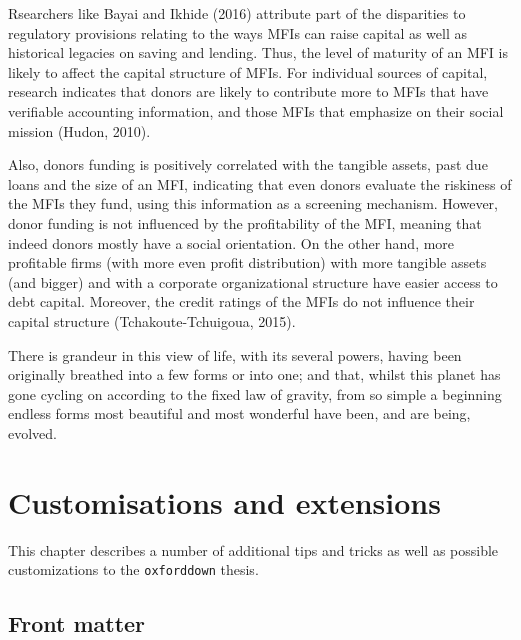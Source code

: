 \documentclass[a4paper, nobind]{templates/ociamthesis}
\begin{document}
Rsearchers like Bayai and Ikhide (2016) attribute part of the disparities to regulatory provisions relating to the ways MFIs can raise capital as well as historical legacies on saving and lending. Thus, the level of maturity of an MFI is likely to affect the capital structure of MFIs. For individual sources of capital, research indicates that donors are likely to contribute more to MFIs that have verifiable accounting information, and those MFIs that emphasize on their social mission (Hudon, 2010).

Also, donors funding is positively correlated with the tangible assets, past due loans and the size of an MFI, indicating that even donors evaluate the riskiness of the MFIs they fund, using this information as a screening mechanism. However, donor funding is not influenced by the profitability of the MFI, meaning that indeed donors mostly have a social orientation. On the other hand, more profitable firms (with more even profit distribution) with more tangible assets (and bigger) and with a corporate organizational structure have easier access to debt capital. Moreover, the credit ratings of the MFIs do not influence their capital structure (Tchakoute-Tchuigoua, 2015).

\begin{savequote}
There is grandeur in this view of life, with its several powers, having
been originally breathed into a few forms or into one; and that, whilst
this planet has gone cycling on according to the fixed law of gravity,
from so simple a beginning endless forms most beautiful and most
wonderful have been, and are being, evolved.
\end{savequote}



\hypertarget{customisations-and-extensions}{%
\chapter{Customisations and extensions}\label{customisations-and-extensions}}

\minitoc 

\noindent This chapter describes a number of additional tips and tricks as well as possible customizations to the \texttt{oxforddown} thesis.

\hypertarget{front-matter}{%
\section{Front matter}\label{front-matter}}
\end{document}
